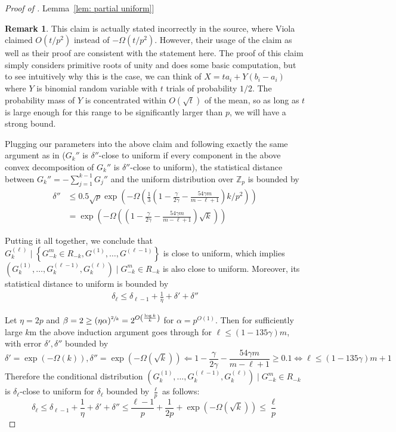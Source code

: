 \documentclass[11pt]{article}
\numberwithin{equation}{section}
\theoremstyle{definition}
\newtheorem{remark}[theorem]{Remark}
\theoremstyle{plain}
\newcommand{\Z}{\mathbb Z}
\newcommand{\expref}[2]{\hyperref[#2]{#1~\ref{#2}}}
\newcommand{\set}[1]{{\left \{{#1} \right \}}}
\newcommand{\Cond}{\;\Big|\;}
\newcommand{\error}{\ensuremath{\delta}}
\newcommand{\bigo}[1]{\ensuremath{{{O} \left( {#1} \right)}}}
\newcommand{\bigomega}[1]{\ensuremath{{\Omega \left( {#1} \right)}}}
\begin{document}
\begin{proof}[Proof of \expref{Lemma}{lem: partial uniform}]
		{\color{black}\begin{remark}
		\label{remark:uniform}
		This claim is actually stated incorrectly in the source, where Viola claimed $O(t/p^2)$ instead of $-\Omega(t/p^2)$. However, their usage of the claim as well as their proof are consistent with the statement here. The proof of this claim simply considers primitive roots of unity and does some basic computation, but to see intuitively why this is the case, we can think of $X = ta_i + Y(b_i - a_i)$ where $Y$ is binomial random variable with $t$ trials of probability $1/2$. The probability mass of $Y$ is concentrated within $O(\sqrt{t})$ of the mean, so as long as $t$ is large enough for this range to be significantly larger than $p$, we will have a strong bound.
		\end{remark}
		}

		Plugging our parameters into the above claim and following exactly the same argument as in \cite{Viola:2013we} ($G_k''$ is $\error''$-close to uniform if every component in the above convex decomposition of $G_k''$ is $\error''$-close to uniform),
		the statistical distance between $G_k''=-\sum_{j=1}^{k-1} G_j''$ and the uniform distribution over $\Z_p$ is bounded by
		\begin{align*}
			\error'' &\le 0.5\sqrt{p}\exp\left(-\bigomega{\frac{1}{3} \left(1-\frac{\gamma}{2\gamma}- \frac {54\gamma m}{m-\ell+1}\right)k/p^2} \right)\\
			&= \exp\left(-\bigomega{\left(1-\frac{\gamma}{2\gamma}- \frac {54\gamma m}{m-\ell+1}\right)\sqrt{k}} \right)
		\end{align*}


		Putting it all together, we conclude that $G_k^{(\ell)}\Cond\set{G_{-k}^m\in R_{-k}, G^{(1)},\dots,G^{(\ell-1)}}$ is close to uniform,
		which implies 
		$\left(G_k^{(1)},\dots,G_k^{(\ell-1)},G_k^{(\ell)}\right)\Cond G_{-k}^m \in R_{-k}$ is also close to uniform.
		Moreover, its statistical distance to uniform is bounded by 
		\begin{align*}
			\error_{\ell} \le \error_{\ell-1}+ \frac{1}{\eta}+\error'+\error''
		\end{align*}

		Let $\eta=2p$ and $\beta=2\ge (\eta\alpha)^{\sfrac{2}{k}}=2^{\bigo{\frac{\log k}{k}}}$ for $\alpha=p^\bigo{1}$.
		Then for sufficiently large $k$m 
		the above induction argument goes through for $\ell\le (1-135\gamma) m$, with error $\error',\error''$ bounded by
		$$ \error'= \exp\left(-\bigomega{{k}}\right), \error''=\exp\left(-\bigomega{\sqrt{k}}\right) \Longleftarrow 1-\frac{\gamma}{2\gamma}- \frac {54\gamma m}{m-\ell+1}
		\ge 0.1 \Longleftrightarrow \ell \le (1-135\gamma) m +1 $$
		Therefore the conditional distribution $\left(G_k^{(1)},\dots,G_k^{(\ell-1)},G_k^{(\ell)}\right)\Cond G_{-k}^m \in R_{-k}$ is $\error_{\ell}$-close to uniform for $\error_{\ell}$ bounded by $\frac{\ell}{p}$ as follows:
		$$\error_{\ell} \le \error_{\ell-1}+\frac{1}{\eta}+\error'+\error''\le \frac{\ell-1}{p}+\frac{1}{2p}+ \exp\left(-\bigomega{\sqrt{k}}\right)\le \frac{\ell}{p}$$


\end{proof}
\end{document}
